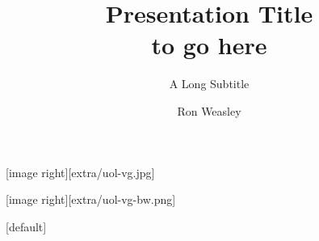 \documentclass[
aspectratio=169,
]{beamer}
\title{Presentation Title\\to go here}
\subtitle{A Long Subtitle}
\author{Ron Weasley}
\institute{Computer Science}
\begin{document}



{
[image right][extra/uol-vg.jpg]

\begin{frame}
\maketitle
\end{frame}
}

[image right][extra/uol-vg-bw.png]  %
\begin{frame}[uolcolours=Pink]  %
\maketitle
\end{frame}
[default]  %
\end{document}
